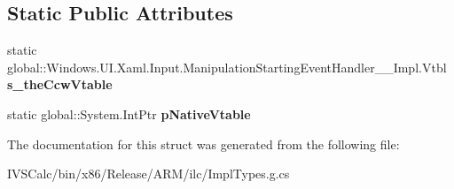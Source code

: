 \subsection*{Static Public Attributes}
\begin{DoxyCompactItemize}
\item 
\mbox{\label{struct_windows_1_1_u_i_1_1_xaml_1_1_input_1_1_manipulation_starting_event_handler_____impl_1_1_vtbl_a0a58d25a3d211683e4e2f1a28d647cc0}} 
static global\+::\+Windows.\+U\+I.\+Xaml.\+Input.\+Manipulation\+Starting\+Event\+Handler\+\_\+\+\_\+\+Impl.\+Vtbl {\bfseries s\+\_\+the\+Ccw\+Vtable}
\item 
\mbox{\label{struct_windows_1_1_u_i_1_1_xaml_1_1_input_1_1_manipulation_starting_event_handler_____impl_1_1_vtbl_ae81f796451a2be52f608d4280a4abd77}} 
static global\+::\+System.\+Int\+Ptr {\bfseries p\+Native\+Vtable}
\end{DoxyCompactItemize}


The documentation for this struct was generated from the following file\+:\begin{DoxyCompactItemize}
\item 
I\+V\+S\+Calc/bin/x86/\+Release/\+A\+R\+M/ilc/Impl\+Types.\+g.\+cs\end{DoxyCompactItemize}
